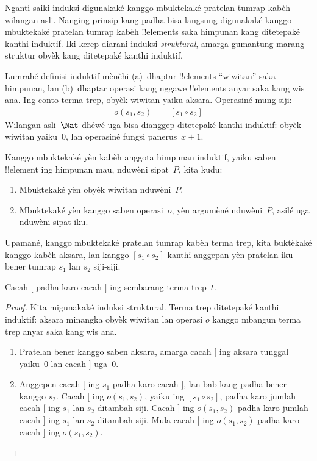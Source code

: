 \documentclass[../../../include/open-logic-section]{subfiles}
\begin{document}


Nganti saiki induksi digunakaké kanggo
mbuktekaké pratelan tumrap kabèh wilangan
asli. Nanging prinsip kang padha bisa
langsung digunakaké kanggo mbuktekaké
pratelan tumrap kabèh !!{element}s
saka himpunan kang ditetepaké
kanthi induktif. Iki kerep diarani
induksi \emph{struktural}, amarga
gumantung marang struktur obyèk
kang ditetepaké kanthi induktif.

Lumrahé definisi induktif mènèhi
(a)~dhaptar !!{element}s ``wiwitan''
saka himpunan, lan (b)~dhaptar
operasi kang nggawe !!{element}s
anyar saka kang wis ana. Ing
conto terma trep, obyèk wiwitan
yaiku aksara. Operasiné mung siji:
\begin{align*}
  o(s_1, s_2) = & [s_1 \circ s_2]
\end{align*}
Wilangan asli~$\Nat$ dhéwé uga
bisa dianggep ditetepaké
kanthi induktif: obyèk wiwitan
yaiku~$0$, lan operasiné
fungsi panerus~$x + 1$.

Kanggo mbuktekaké yèn kabèh
anggota himpunan induktif,
yaiku saben !!{element} ing
himpunan mau, nduwèni
sipat~$P$, kita kudu:
\begin{enumerate}
\item Mbuktekaké yèn obyèk
  wiwitan nduwèni~$P$.
\item Mbuktekaké yèn kanggo
  saben operasi~$o$, yèn
  argumèné nduwèni~$P$,
  asilé uga nduwèni sipat iku.
\end{enumerate}
Upamané, kanggo mbuktekaké
pratelan tumrap kabèh terma
trep, kita buktèkaké kanggo
kabèh aksara, lan kanggo
$[s_1 \circ s_2]$ kanthi
anggepan yèn pratelan iku
bener tumrap $s_1$ lan
$s_2$ siji-siji.

\begin{prop}
  Cacah $[$ padha karo cacah
  $]$ ing sembarang terma
  trep~$t$.
\end{prop}

\begin{proof}
Kita migunakaké induksi
struktural. Terma trep
ditetepaké kanthi
induktif: aksara minangka
obyèk wiwitan lan operasi
$o$ kanggo mbangun terma
trep anyar saka kang wis ana.
\begin{enumerate}
\item Pratelan bener kanggo
  saben aksara, amarga
  cacah $[$ ing aksara
  tunggal yaiku~$0$ lan
  cacah $]$ uga~$0$.
\item Anggepen cacah $[$
  ing $s_1$ padha karo
  cacah $]$, lan bab kang
  padha bener kanggo $s_2$.
  Cacah $[$ ing
  $o(s_1, s_2)$, yaiku
  ing $[s_1 \circ s_2]$,
  padha karo jumlah cacah
  $[$ ing $s_1$ lan
  $s_2$ ditambah siji.
  Cacah $]$ ing
  $o(s_1, s_2)$ padha
  karo jumlah cacah $]$
  ing $s_1$ lan $s_2$
  ditambah siji. Mula
  cacah $[$ ing
  $o(s_1, s_2)$ padha
  karo cacah $]$ ing
  $o(s_1,s_2)$.
\end{enumerate}
\end{proof}
\end{document}
